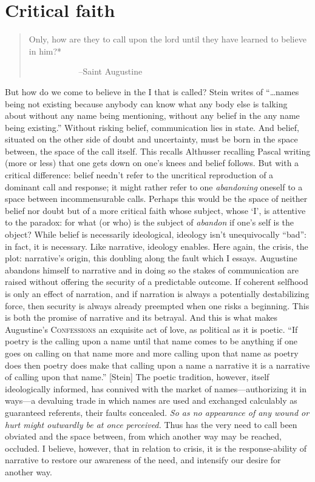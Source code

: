 \documentclass[
]{memoir}
\begin{document}
\hypertarget{critical-faith}{%
\section*{Critical faith}\label{critical-faith}}

\begin{quote}
Only, how are they to call upon the lord until they have learned to
believe in him?*

~~~~~~~~~~ ~--Saint Augustine
\end{quote}

But how do we come to believe in the I that is called? Stein writes of
``\ldots{}names being not existing because anybody can know what any
body else is talking about without any name being mentioning, without
any belief in the any name being existing.'' Without risking belief,
communication lies in state. And belief, situated on the other side of
doubt and uncertainty, must be born in the space between, the space of
the call itself. This recalls Althusser recalling Pascal writing (more
or less) that one gets down on one's knees and belief follows. But with
a critical difference: belief needn't refer to the uncritical
reproduction of a dominant call and response; it might rather refer to
one \emph{abandoning} oneself to a space between incommensurable calls.
Perhaps this would be the space of neither belief nor doubt but of a
more critical faith whose subject, whose `I', is attentive to the
paradox: for what (or who) is the subject of \emph{abandon} if one's
self is the object? While belief is necessarily ideological, ideology
isn't unequivocally ``bad'': in fact, it is necessary. Like narrative,
ideology enables. Here again, the crisis, the plot: narrative's origin,
this doubling along the fault which I essays. Augustine abandons himself
to narrative and in doing so the stakes of communication are raised
without offering the security of a predictable outcome. If coherent
selfhood is only an effect of narration, and if narration is always a
potentially destabilizing force, then security is always already
preempted when one risks a beginning. This is both the promise of
narrative and its betrayal. And this is what makes Augustine's
\textsc{Confessions} an exquisite act of love, as political as it is
poetic. ``If poetry is the calling upon a name until that name comes to
be anything if one goes on calling on that name more and more calling
upon that name as poetry does then poetry does make that calling upon a
name a narrative it is a narrative of calling upon that name.''
{[}Stein{]} The poetic tradition, however, itself ideologically
informed, has connived with the market of names---authorizing it in
ways---a devaluing trade in which names are used and exchanged
calculably as guaranteed referents, their faults concealed. \emph{So as
no appearance of any wound or hurt might outwardly be at once
perceived.} Thus has the very need to call been obviated and the space
between, from which another way may be reached, occluded. I believe,
however, that in relation to crisis, it is the response-ability of
narrative to restore our awareness of the need, and intensify our desire
for another way.
\end{document}
